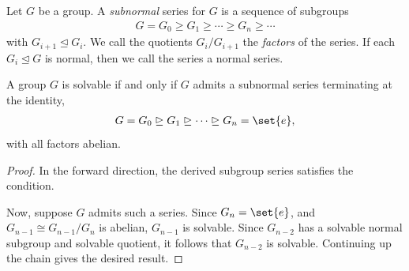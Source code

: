 \documentclass[10pt]{mypackage}
\begin{document}
\begin{definition}
  Let $G$ be a group. A \textit{subnormal} series for $G$ is a sequence of subgroups
  \begin{align*}
    G = G_0 \geq G_1\geq \cdots \geq G_n \geq \cdots
  \end{align*}
  with $G_{i+1}\trianglelefteq G_i$. We call the quotients $G_{i}/G_{i+1}$ the \textit{factors} of the series. If each $G_i\trianglelefteq G$ is normal, then we call the series a normal series.
\end{definition}
\begin{proposition}
  A group $G$ is solvable if and only if $G$ admits a subnormal series terminating at the identity,
  \begin{align*}
    G = G_0\trianglerighteq G_1\trianglerighteq\cdots\trianglerighteq G_n = \set{e},
  \end{align*}
  with all factors abelian.
\end{proposition}
\begin{proof}
  In the forward direction, the derived subgroup series satisfies the condition.%

  Now, suppose $G$ admits such a series. Since $G_n = \set{e}$, and $G_{n-1}\cong G_{n-1}/G_n$ is abelian, $G_{n-1}$ is solvable. Since $G_{n-2}$ has a solvable normal subgroup and solvable quotient, it follows that $G_{n-2}$ is solvable. Continuing up the chain gives the desired result.
\end{proof}
\end{document}
